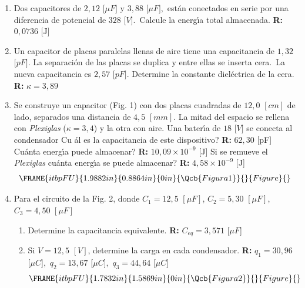 \documentclass{article}
\begin{document}
\begin{enumerate}
\item Dos capacitores de $2,12$ [$\mu F]$ y $3,88$ [$\mu F],$ est\'{a}n
conectados en serie por una diferencia de potencial de $328$ [$V]$.\ Calcule
la energ\'{\i}a total almacenada. \textbf{R: }$0,0736$ [J]

\item Un capacitor de placas paralelas llenas de aire tiene una capacitancia
de $1,32$ [$pF]$. La separaci\'{o}n de las placas se duplica y entre ellas
se inserta cera.\ La nueva capacitancia es $2,57$ [$pF]$. Determine la
constante diel\'{e}ctrica de la cera. \textbf{R: }$\kappa =3,89$

\item Se construye un capacitor (Fig. 1) con dos placas cuadradas de $12,0$ $%
[cm]$ de lado, separados una distancia de $4,5$ $[mm]$. La mitad del espacio
se rellena con \textit{Plexiglas} ($\kappa =3,4$) y la otra con aire. Una
bater\'{\i}a de $18$ [$V]$ se conecta al condensador \textquestiondown Cu%
\'{a}l es la capacitancia de este dispositivo? \textbf{R: }$62,30$ [pF] 
\textquestiondown Cu\'{a}nta energ\'{\i}a puede almacenar? \textbf{R: }$%
10,09\times 10^{-9}$ [J] Si se remueve el \textit{Plexiglas} 
\textquestiondown cu\'{a}nta energ\'{\i}a se puede almacenar? \textbf{R: }$%
4,58\times 10^{-9}$ [J]%
\begin{equation*}
\FRAME{itbpFU}{1.9882in}{0.8864in}{0in}{\Qcb{Figura 1}}{}{Figure}{\special%
{language "Scientific Word";type "GRAPHIC";maintain-aspect-ratio
TRUE;display "USEDEF";valid_file "T";width 1.9882in;height 0.8864in;depth
0in;original-width 6.5855in;original-height 2.9196in;cropleft "0";croptop
"1";cropright "1";cropbottom "0";tempfilename
'R23O0G01.wmf';tempfile-properties "XPR";}}
\end{equation*}%
\pagebreak

\item Para el circuito de la Fig. 2, donde $C_{1}=12,5$ $[\mu F]$, $%
C_{2}=5,30$ $[\mu F]$, $C_{3}=4,50$ $[\mu F]$

\begin{enumerate}
\item Determine la capacitancia equivalente. \textbf{R:} $C_{eq}=3,571$ [$%
\mu F$]

\item Si $V=12,5$ $[V]$, determine la carga en cada condensador. \textbf{R:} 
$q_{1}=30,96$ [$\mu C$]$,$ $q_{2}=13,67$ [$\mu C$]$,$ $q_{3}=44,64$ [$\mu C$]%
\begin{equation*}
\FRAME{itbpFU}{1.7832in}{1.5869in}{0in}{\Qcb{Figura 2}}{}{Figure}{\special%
{language "Scientific Word";type "GRAPHIC";maintain-aspect-ratio
TRUE;display "USEDEF";valid_file "T";width 1.7832in;height 1.5869in;depth
0in;original-width 6.3771in;original-height 5.6723in;cropleft "0";croptop
"1";cropright "1";cropbottom "0";tempfilename
'R23O0G02.wmf';tempfile-properties "XPR";}}
\end{equation*}
\end{enumerate}


\end{enumerate}
\end{document}
